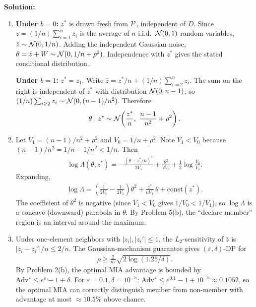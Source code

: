 \documentclass[12pt]{article}
\begin{document}
\begin{enumerate}
\begin{solution}
{\bf Solution:}\\
\begin{enumerate}
    \item \textbf{Under $b=0$:} $z^*$ is drawn fresh from ${\cal P}$, independent of $D$. Since $\bar z = (1/n)\sum_{i=1}^n z_i$ is the average of $n$ i.i.d.\ ${\cal N}(0,1)$ random variables, $\bar z \sim {\cal N}(0, 1/n)$. Adding the independent Gaussian noise, $\theta = \bar z + W \sim {\cal N}(0, 1/n + \rho^2)$. Independence with $z^*$ gives the stated conditional distribution.

    \textbf{Under $b=1$:} $z^* = z_1$. Write $\bar z = z^*/n + (1/n)\sum_{i=2}^n z_i$. The sum on the right is independent of $z^*$ with distribution ${\cal N}(0, n-1)$, so $(1/n)\sum_{i \ge 2} z_i \sim {\cal N}(0, (n-1)/n^2)$. Therefore
    \begin{align*}
        \theta \mid z^* \sim {\cal N}\!\left(\frac{z^*}{n},\ \frac{n-1}{n^2} + \rho^2\right).
    \end{align*}

    \item Let $V_1 = (n-1)/n^2 + \rho^2$ and $V_0 = 1/n + \rho^2$. Note $V_1 < V_0$ because $(n-1)/n^2 = 1/n - 1/n^2 < 1/n$. Then
    \begin{align*}
        \log\Lambda(\theta, z^*) = -\frac{(\theta - z^*/n)^2}{2V_1} + \frac{\theta^2}{2V_0} + \frac{1}{2}\log\frac{V_0}{V_1}.
    \end{align*}
    Expanding,
    \begin{align*}
        \log\Lambda = \left(\frac{1}{2V_0} - \frac{1}{2V_1}\right)\theta^2 + \frac{z^*}{n V_1}\,\theta + \mathrm{const}(z^*).
    \end{align*}
    The coefficient of $\theta^2$ is negative (since $V_1 < V_0$ gives $1/V_0 < 1/V_1$), so $\log\Lambda$ is a concave (downward) parabola in $\theta$. By Problem 5(b), the ``declare member'' region is an interval around the maximum.

    \item Under one-element neighbors with $|z_i|, |z_i'| \le 1$, the $L_2$-sensitivity of $\bar z$ is $|z_i - z_i'|/n \le 2/n$. The Gaussian-mechanism guarantee gives $(\varepsilon, \delta)$-DP for
    \begin{align*}
        \rho \ge \frac{2}{n\varepsilon}\sqrt{2\log(1.25/\delta)}.
    \end{align*}
    By Problem 2(b), the optimal MIA advantage is bounded by $\mathrm{Adv}^\star \le e^\varepsilon - 1 + \delta$. For $\varepsilon = 0.1, \delta = 10^{-5}$: $\mathrm{Adv}^\star \le e^{0.1} - 1 + 10^{-5} \approx 0.1052$, so the optimal MIA can correctly distinguish member from non-member with advantage at most $\approx 10.5\%$ above chance.


\end{enumerate}
\end{solution}
\end{enumerate}
\end{document}
